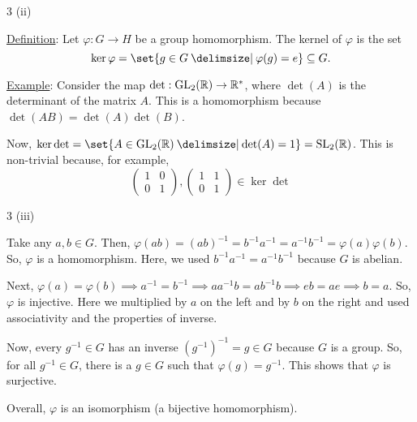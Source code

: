 \documentclass[11pt]{penrose}
\begin{document}
\begin{problem}{3 (ii)}

    \underline{Definition}: Let $\varphi:G \to H$ be a group homomorphism. The kernel of $\varphi$ is the set
    \begin{equation*}
        \ker\varphi = \set{g \in G \st \varphi(g) = e} \subseteq G.
    \end{equation*}

    \underline{Example}: Consider the map $\det: \mathrm{GL}_2(\mathbb{R}) \to \mathbb{R}^*$, where $\det(A)$ is the determinant of the matrix $A$. This is a homomorphism because $\det(AB) = \det(A) \det(B)$.

    Now, $\ker\det = \set{A \in \GL_2(\R) \st \det(A) = 1} = \SL_2(\R)$. This is non-trivial because, for example,
    \begin{equation*}
        \begin{pmatrix*} 1 & 0 \\ 0 & 1 \end{pmatrix*},
        \begin{pmatrix*} 1 & 1 \\ 0 & 1 \end{pmatrix*}
        \in \ker\det
    \end{equation*}
\end{problem}

\begin{problem}{3 (iii)}

    Take any $a,b \in G$. Then, $\varphi(ab) = (ab)^{-1} = b^{-1} a^{-1} = a^{-1} b^{-1} = \varphi(a)\varphi(b)$. So, $\varphi$ is a homomorphism. Here, we used $b^{-1} a^{-1} = a^{-1} b^{-1}$ because $G$ is abelian.

    Next, $\varphi(a) = \varphi(b) \implies a^{-1} = b^{-1} \implies aa^{-1}b = ab^{-1}b \implies eb = ae \implies b = a$. So, $\varphi$ is injective. Here we multiplied by $a$ on the left and by $b$ on the right and used associativity and the properties of inverse.

    Now, every $g^{-1} \in G$ has an inverse $(g^{-1})^{-1} = g \in G$ because $G$ is a group. So, for all $g^{-1} \in G$, there is a $g \in G$ such that $\varphi(g) = g^{-1}$. This shows that $\varphi$ is surjective.

    Overall, $\varphi$ is an isomorphism (a bijective homomorphism).
\end{problem}
\end{document}
